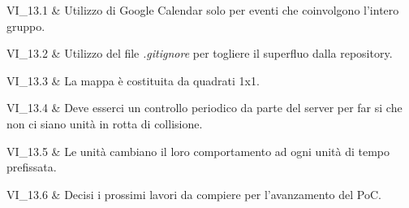 VI\_13.1 & Utilizzo di Google Calendar solo per eventi che coinvolgono l'intero gruppo.

\tabularnewline 

VI\_13.2 & Utilizzo del file \textit{.gitignore} per togliere il superfluo dalla repository.

\tabularnewline 

VI\_13.3 & La mappa è costituita da quadrati 1x1.

\tabularnewline 
	
VI\_13.4 & Deve esserci un controllo periodico da parte del server per far si che non ci siano unità in rotta di collisione.

\tabularnewline 
VI\_13.5 & Le unità cambiano il loro comportamento ad ogni unità di tempo prefissata.

\tabularnewline 
VI\_13.6 & Decisi i prossimi lavori da compiere per l'avanzamento del PoC.
